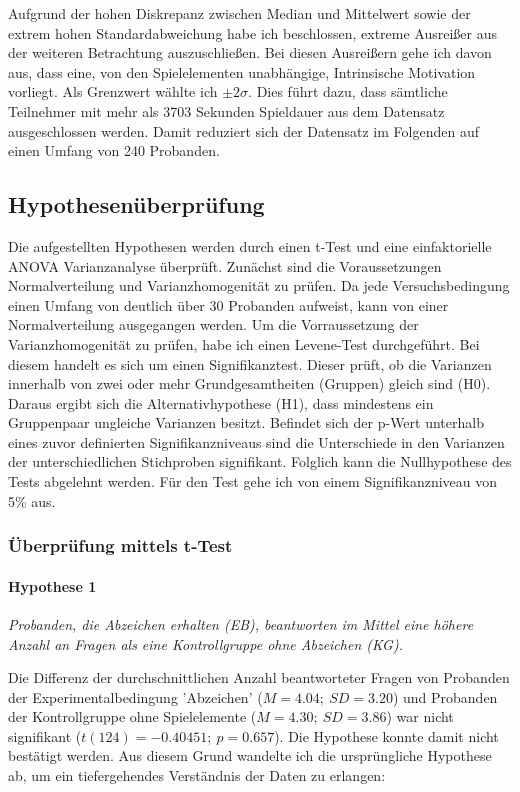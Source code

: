 Aufgrund der hohen Diskrepanz zwischen Median und Mittelwert sowie der extrem hohen Standardabweichung habe ich beschlossen, extreme Ausreißer aus der weiteren Betrachtung auszuschließen. Bei diesen Ausreißern gehe ich davon aus, dass eine, von den Spielelementen unabhängige, Intrinsische Motivation vorliegt. Als Grenzwert wählte ich $\pm 2\sigma$. Dies führt dazu, dass sämtliche Teilnehmer mit mehr als 3703 Sekunden Spieldauer aus dem Datensatz ausgeschlossen werden. Damit reduziert sich der Datensatz im Folgenden auf einen Umfang von 240 Probanden.

\subsection{Hypothesenüberprüfung}
Die aufgestellten Hypothesen werden durch einen t-Test und eine einfaktorielle  ANOVA  Varianzanalyse überprüft. Zunächst sind die Voraussetzungen Normalverteilung und Varianzhomogenität zu prüfen. Da jede Versuchsbedingung einen Umfang von deutlich über 30 Probanden aufweist, kann von einer Normalverteilung ausgegangen werden. Um die Vorraussetzung der Varianzhomogenität zu prüfen, habe ich einen Levene-Test durchgeführt. Bei diesem handelt es sich um einen Signifikanztest. Dieser prüft, ob die Varianzen innerhalb von zwei oder mehr Grundgesamtheiten (Gruppen) gleich sind (H0). Daraus ergibt sich die Alternativhypothese (H1), dass mindestens ein Gruppenpaar ungleiche Varianzen besitzt. Befindet sich der p-Wert unterhalb  eines zuvor definierten Signifikanzniveaus sind die Unterschiede in den Varianzen der unterschiedlichen Stichproben signifikant. Folglich kann die Nullhypothese des Tests abgelehnt werden. Für den Test gehe ich von einem Signifikanzniveau von 5\% aus. 

\subsubsection{Überprüfung mittels t-Test}

\paragraph{Hypothese 1 }
\begin{center}
    \textit{Probanden, die Abzeichen erhalten (EB), beantworten im Mittel eine höhere Anzahl an Fragen als eine Kontrollgruppe ohne Abzeichen (KG).} 
\end{center}

Die Differenz der durchschnittlichen Anzahl beantworteter Fragen von Probanden der Experimentalbedingung 'Abzeichen' ($M =4.04;\:SD=3.20$) und Probanden der Kontrollgruppe ohne Spielelemente ($M=4.30;\:SD=3.86$) war nicht signifikant ($t (124) = -0.40451;\: p = 0.657$). Die Hypothese konnte damit nicht bestätigt werden. Aus diesem Grund wandelte ich die ursprüngliche Hypothese ab, um ein tiefergehendes Verständnis der Daten zu erlangen: 

